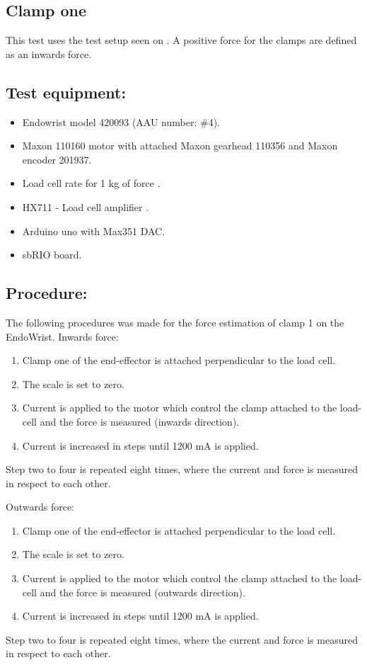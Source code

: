 \subsection{Clamp one} %
This test uses the test setup seen on . A positive force for the clamps are defined as an inwards force.

\subsection*{Test equipment:}
\begin{itemize}
\item Endowrist model 420093 (AAU number: \#4).
\item Maxon 110160 motor with attached Maxon gearhead 110356 and Maxon encoder 201937.
\item Load cell rate for 1 kg of force \cite{Load_cell_1kg}.
\item HX711 - Load cell amplifier \cite{HX711}.
\item Arduino uno with Max351 DAC.
\item sbRIO board.
\end{itemize}

\subsection*{Procedure:}
The following procedures was made for the force estimation of clamp 1 on the EndoWrist. 
Inwards force:
\begin{enumerate}
\item Clamp one of the end-effector is attached perpendicular to the load cell. 
\item The scale is set to zero.
\item Current is applied to the motor which control the clamp attached to the load-cell and the force is measured (inwards direction).
\item Current is increased in steps until 1200 mA is applied.
\end{enumerate}
Step two to four is repeated eight times, where the current and force is measured in respect to each other. 

Outwards force:
\begin{enumerate}
\item Clamp one of the end-effector is attached perpendicular to the load cell. 
\item The scale is set to zero.
\item Current is applied to the motor which control the clamp attached to the load-cell and the force is measured (outwards direction).
\item Current is increased in steps until 1200 mA is applied.
\end{enumerate}
Step two to four is repeated eight times, where the current and force is measured in respect to each other. 

